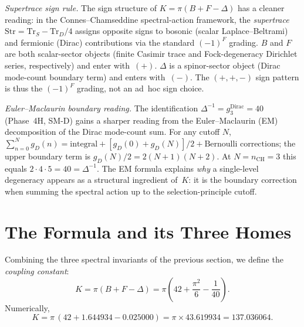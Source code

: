 \documentclass[aps,prl,twocolumn,superscriptaddress]{revtex4-2}
\begin{document}
\emph{Supertrace sign rule.}  The sign structure of
$K = \pi(B + F - \Delta)$ has a cleaner reading: in the
Connes--Chamseddine spectral-action framework, the
\emph{supertrace} $\mathrm{Str} = \mathrm{Tr}_{S} - \mathrm{Tr}_{D}/4$
assigns opposite signs to bosonic (scalar Laplace--Beltrami) and
fermionic (Dirac) contributions via the standard $(-1)^{F}$ grading.
$B$ and $F$ are both scalar-sector objects (finite Casimir trace and
Fock-degeneracy Dirichlet series, respectively) and enter with~$(+)$.
$\Delta$ is a spinor-sector object (Dirac mode-count boundary term)
and enters with~$(-)$.  The $(+,+,-)$ sign pattern is thus the
$(-1)^{F}$ grading, not an ad~hoc sign choice.

\emph{Euler--Maclaurin boundary reading.}  The identification
$\Delta^{-1} = g_{3}^{\mathrm{Dirac}} = 40$ (Phase~4H, SM-D) gains a
sharper reading from the Euler--Maclaurin (EM) decomposition of the
Dirac mode-count sum.  For any cutoff $N$,
$\sum_{n=0}^{N} g_{D}(n) = \text{integral} + [g_{D}(0) + g_{D}(N)]/2
+ \text{Bernoulli corrections}$; the upper boundary term is
$g_{D}(N)/2 = 2(N+1)(N+2)$.  At $N = n_{\mathrm{CH}} = 3$ this equals
$2 \cdot 4 \cdot 5 = 40 = \Delta^{-1}$.
The EM formula explains \emph{why} a single-level degeneracy appears
as a structural ingredient of~$K$: it is the boundary correction when
summing the spectral action up to the selection-principle cutoff.

%
\section{The Formula and its Three Homes}\label{sec:formula}

Combining the three spectral invariants of the previous section, we
define the \textit{coupling constant}:
\begin{equation}\label{eq:K}
  K = \pi\!\left(B + F - \Delta\right)
    = \pi\!\left(42 + \frac{\pi^2}{6} - \frac{1}{40}\right).
\end{equation}
Numerically,
\begin{equation}
  K = \pi\,(42 + 1.644934 - 0.025000)
    = \pi \times 43.619934
    = 137.036064.
\end{equation}
\end{document}
